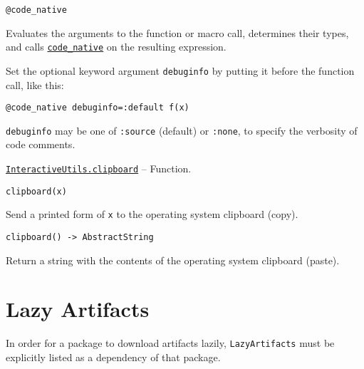 \begin{adjustwidth}{2em}{0pt}


\begin{verbatim}
@code_native
\end{verbatim}

Evaluates the arguments to the function or macro call, determines their types, and calls \hyperlink{2534314152947301270}{\texttt{code\_native}} on the resulting expression.

Set the optional keyword argument \texttt{debuginfo} by putting it before the function call, like this:


\begin{lstlisting}
@code_native debuginfo=:default f(x)
\end{lstlisting}

\texttt{debuginfo} may be one of \texttt{:source} (default) or \texttt{:none}, to specify the verbosity of code comments.



\end{adjustwidth}
\hypertarget{17688389159658604177}{}
\hyperlink{17688389159658604177}{\texttt{InteractiveUtils.clipboard}}  -- {Function.}

\begin{adjustwidth}{2em}{0pt}


\begin{verbatim}
clipboard(x)
\end{verbatim}

Send a printed form of \texttt{x} to the operating system clipboard ({\textquotedbl}copy{\textquotedbl}).




\begin{lstlisting}
clipboard() -> AbstractString
\end{lstlisting}

Return a string with the contents of the operating system clipboard ({\textquotedbl}paste{\textquotedbl}).



\end{adjustwidth}

\hypertarget{15736192962261627319}{}


\chapter{Lazy Artifacts}





In order for a package to download artifacts lazily, \texttt{LazyArtifacts} must be explicitly listed as a dependency of that package.



